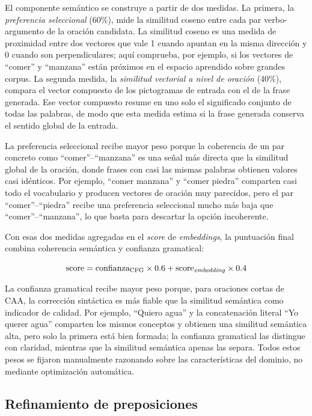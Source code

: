El componente semántico se construye a partir de dos medidas. La primera, la \textit{preferencia seleccional} (60\%), mide la similitud coseno entre cada par verbo-argumento de la oración candidata. La similitud coseno es una medida de proximidad entre dos vectores que vale 1 cuando apuntan en la misma dirección y 0 cuando son perpendiculares; aquí comprueba, por ejemplo, si los vectores de ``comer'' y ``manzana'' están próximos en el espacio aprendido sobre grandes corpus. La segunda medida, la \textit{similitud vectorial a nivel de oración} (40\%), compara el vector compuesto de los pictogramas de entrada con el de la frase generada. Ese vector compuesto resume en uno solo el significado conjunto de todas las palabras, de modo que esta medida estima si la frase generada conserva el sentido global de la entrada.

La preferencia seleccional recibe mayor peso porque la coherencia de un par concreto como ``comer''--``manzana'' es una señal más directa que la similitud global de la oración, donde frases con casi las mismas palabras obtienen valores casi idénticos. Por ejemplo, ``comer manzana'' y ``comer piedra'' comparten casi todo el vocabulario y producen vectores de oración muy parecidos, pero el par ``comer''--``piedra'' recibe una preferencia seleccional mucho más baja que ``comer''--``manzana'', lo que basta para descartar la opción incoherente.

Con esas dos medidas agregadas en el \textit{score} de \textit{embeddings}, la puntuación final combina coherencia semántica y confianza gramatical:

$$\text{score} = \text{confianza}_{\text{CFG}} \times 0.6 + \text{score}_{\text{\textit{embedding}}} \times 0.4$$

\noindent La confianza gramatical recibe mayor peso porque, para oraciones cortas de CAA, la corrección sintáctica es más fiable que la similitud semántica como indicador de calidad. Por ejemplo, ``Quiero agua'' y la concatenación literal ``Yo querer agua'' comparten los mismos conceptos y obtienen una similitud semántica alta, pero solo la primera está bien formada; la confianza gramatical las distingue con claridad, mientras que la similitud semántica apenas las separa. Todos estos pesos se fijaron manualmente razonando sobre las características del dominio, no mediante optimización automática.

\subsection{Refinamiento de preposiciones}
\label{sec:f2-preposiciones}

